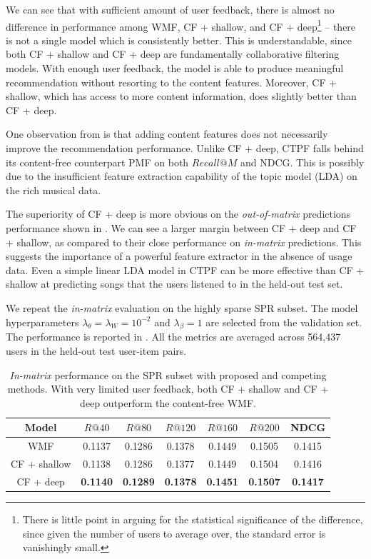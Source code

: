 We can see that with sufficient amount of user feedback, there is almost no difference in performance among \gls{WMF}, CF + shallow, and CF + deep\footnote{There is little point in arguing for the statistical significance of the difference, since given the number of users to average over, the standard error is vanishingly small.} -- there is not a single model which is consistently better. This is understandable, since both CF + shallow and CF + deep are fundamentally collaborative filtering models. With enough user feedback, the model is able to produce meaningful recommendation without resorting to the content features. Moreover, CF + shallow, which has access to more content information, does slightly better than CF + deep.

One observation from  is that adding content features does not necessarily improve the recommendation performance. Unlike CF + deep, \gls{CTPF} falls behind its content-free counterpart \gls{PMF} on both $Recall@M$ and NDCG. This is possibly due to the insufficient feature extraction capability of the topic model (\gls{LDA}) on the rich musical data. 

The superiority of CF + deep is more obvious on the \emph{out-of-matrix} predictions performance shown in . We can see a larger margin between CF + deep and CF + shallow, as compared to their close performance on \emph{in-matrix} predictions. This suggests the importance of a powerful feature extractor in the absence of usage data. Even a simple linear \gls{LDA} model in \gls{CTPF} can be more effective than CF + shallow at predicting songs that the users listened to in the held-out test set. %

 We repeat the \emph{in-matrix} evaluation on the highly sparse SPR subset. The model hyperparameters $\lambda_\theta = \lambda_W = 10^{-2}$ and $\lambda_\beta = 1$ are selected from the validation set. The performance is reported in . All the metrics are averaged across 564,437 users in the held-out test user-item pairs.

\begin{table}
\centering
  \begin{tabular}{ c  c  c  c  c c   c  }
    \toprule
    Model & $R@40$  & $R@80$  & $R@120$  & $R@160$ & $R@200$ & NDCG \\ \midrule
     \gls{WMF} \citep{hu2008collaborative} &  0.1137 &   0.1286 & 0.1378 &   0.1449 &  0.1505 & 0.1415\\
     CF + shallow & 0.1138 &  0.1286 &  0.1377 &  0.1449 &  0.1504 & 0.1416 \\
     CF + deep & \bf{0.1140} & \bf{0.1289} & \bf{0.1378} & \bf{0.1451} & \bf{0.1507} & \bf{0.1417} \\
    \bottomrule
  \end{tabular}
  \caption{\emph{In-matrix} performance on the SPR subset with proposed and competing methods. With very limited user feedback, both CF + shallow and CF + deep outperform the content-free WMF. } 
  \label{tab:spr}
\end{table}


